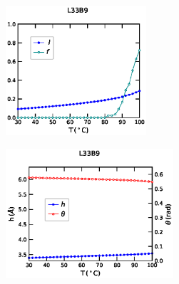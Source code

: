 \documentclass[12pt,masters,final]{UTRGVthesis}
\begin{document}
\begin{figure}[!h]
        \begin{subfigure}[b]{0.49\textwidth}
                \centering
                \includegraphics[height=1.9in, width=.8\textwidth]{L33B9_temp_lf.eps}
                \caption{}
                \label{fig:L33B9lf}
        \end{subfigure}%
        \hspace{3pt}
        \begin{subfigure}[b]{0.49\textwidth}
                \centering
                \includegraphics[height=1.9in, width=.8\textwidth]{L33B9_temp_h_theta.eps}
                \caption{}
                \label{fig:L33B9htheta}
        \end{subfigure}%
        

\end{figure}
\end{document}
